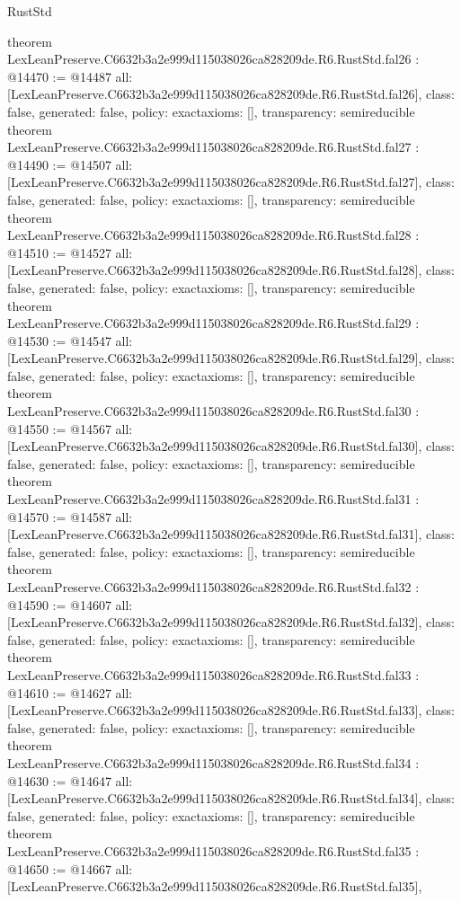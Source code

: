 \begin{lexlean}{RustStd}
\begin{coremodule}
{}
theorem LexLeanPreserve.C6632b3a2e999d115038026ca828209de.R6.RustStd.fal26 : @14470 := @14487 {
  all: [LexLeanPreserve.C6632b3a2e999d115038026ca828209de.R6.RustStd.fal26],
  class: false,
  generated: false,
  policy: exact{axioms: []},
  transparency: semireducible
}
theorem LexLeanPreserve.C6632b3a2e999d115038026ca828209de.R6.RustStd.fal27 : @14490 := @14507 {
  all: [LexLeanPreserve.C6632b3a2e999d115038026ca828209de.R6.RustStd.fal27],
  class: false,
  generated: false,
  policy: exact{axioms: []},
  transparency: semireducible
}
theorem LexLeanPreserve.C6632b3a2e999d115038026ca828209de.R6.RustStd.fal28 : @14510 := @14527 {
  all: [LexLeanPreserve.C6632b3a2e999d115038026ca828209de.R6.RustStd.fal28],
  class: false,
  generated: false,
  policy: exact{axioms: []},
  transparency: semireducible
}
theorem LexLeanPreserve.C6632b3a2e999d115038026ca828209de.R6.RustStd.fal29 : @14530 := @14547 {
  all: [LexLeanPreserve.C6632b3a2e999d115038026ca828209de.R6.RustStd.fal29],
  class: false,
  generated: false,
  policy: exact{axioms: []},
  transparency: semireducible
}
theorem LexLeanPreserve.C6632b3a2e999d115038026ca828209de.R6.RustStd.fal30 : @14550 := @14567 {
  all: [LexLeanPreserve.C6632b3a2e999d115038026ca828209de.R6.RustStd.fal30],
  class: false,
  generated: false,
  policy: exact{axioms: []},
  transparency: semireducible
}
theorem LexLeanPreserve.C6632b3a2e999d115038026ca828209de.R6.RustStd.fal31 : @14570 := @14587 {
  all: [LexLeanPreserve.C6632b3a2e999d115038026ca828209de.R6.RustStd.fal31],
  class: false,
  generated: false,
  policy: exact{axioms: []},
  transparency: semireducible
}
theorem LexLeanPreserve.C6632b3a2e999d115038026ca828209de.R6.RustStd.fal32 : @14590 := @14607 {
  all: [LexLeanPreserve.C6632b3a2e999d115038026ca828209de.R6.RustStd.fal32],
  class: false,
  generated: false,
  policy: exact{axioms: []},
  transparency: semireducible
}
theorem LexLeanPreserve.C6632b3a2e999d115038026ca828209de.R6.RustStd.fal33 : @14610 := @14627 {
  all: [LexLeanPreserve.C6632b3a2e999d115038026ca828209de.R6.RustStd.fal33],
  class: false,
  generated: false,
  policy: exact{axioms: []},
  transparency: semireducible
}
theorem LexLeanPreserve.C6632b3a2e999d115038026ca828209de.R6.RustStd.fal34 : @14630 := @14647 {
  all: [LexLeanPreserve.C6632b3a2e999d115038026ca828209de.R6.RustStd.fal34],
  class: false,
  generated: false,
  policy: exact{axioms: []},
  transparency: semireducible
}
theorem LexLeanPreserve.C6632b3a2e999d115038026ca828209de.R6.RustStd.fal35 : @14650 := @14667 {
  all: [LexLeanPreserve.C6632b3a2e999d115038026ca828209de.R6.RustStd.fal35],
}
\end{coremodule}
\end{lexlean}
